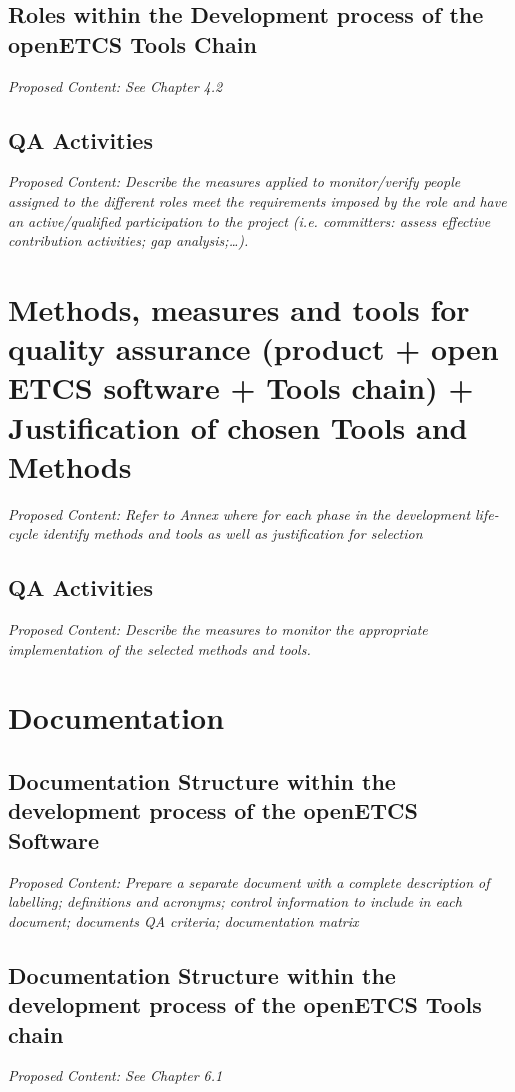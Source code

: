 \documentclass{template/openetcs_article}
\begin{document}
\subsection{Roles within the Development process of the openETCS Tools Chain}
\textit{Proposed Content: See Chapter 4.2}

\subsection{QA Activities}
\textit{Proposed Content: Describe the measures applied to monitor/verify people assigned to the different roles meet the requirements imposed by the role and have an active/qualified participation to the project (i.e. committers: assess effective contribution activities; gap analysis;{\dots}).}

\section{Methods, measures and tools for quality assurance (product + open ETCS software + Tools chain) + Justification of chosen Tools and Methods}
\textit{Proposed Content: Refer to Annex where for each phase in the development life-cycle identify methods and tools as well as justification for selection}

\subsection{QA Activities}
\textit{Proposed Content: Describe the measures to monitor the appropriate implementation of the selected methods and tools.}

\section{Documentation}

\subsection{Documentation Structure within the development process of the openETCS Software}
\textit{Proposed Content: Prepare a separate document with a complete description of labelling; definitions and acronyms; control information to include in each document; documents QA criteria; documentation matrix}

\subsection{Documentation Structure within the development process of the openETCS Tools chain}
\textit{Proposed Content: See Chapter 6.1}
\end{document}

